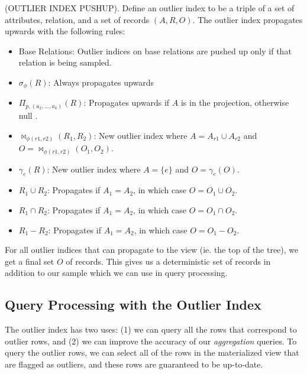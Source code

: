 \begin{definition}
(OUTLIER INDEX PUSHUP). Define an outlier index to be a triple of a set of attributes, relation, and a set of records $(A,R,O)$. The outlier index propagates upwards with the following rules:
\begin{itemize}\vspace{-.45em}
\item Base Relations: Outlier indices on base relations are pushed up only if that relation is being sampled.\vspace{-.45em}
\item $\sigma_{\phi}(R)$: Always propagates upwards \vspace{-.45em}
\item $\Pi_{p,(a_2,...,a_k)}(R)$:  Propagates upwards if $A$ is in the projection, otherwise null .\vspace{-.45em}
\item $\bowtie_{\phi (r1,r2)}(R_1,R_2)$: New outlier index where $A=A_{r1} \cup A_{r2}$ and $O = \bowtie_{\phi (r1,r2)}(O_1,O_2)$.
\item $\gamma_{e}(R)$: New outlier index where $A=\{e\}$ and $O = \gamma_{e}(O)$.\vspace{-.45em} 
\item $R_1 \cup R_2$: Propagates if $A_1 = A_2$, in which case $O = O_1 \cup O_2$. 
\item $R_1 \cap R_2$: Propagates if $A_1 = A_2$, in which case $O = O_1 \cap O_2$.
\item $R_1 - R_2$: Propagates if $A_1 = A_2$, in which case $O = O_1 - O_2$.
\end{itemize}
\end{definition}
For all outlier indices that can propagate to the view (ie. the top of the tree), we get a final set $O$ of records. 
This gives us a deterministic set of records in addition to our sample which we can use in query processing.

\subsection{Query Processing with the Outlier Index} 
The outlier index has two uses: (1) we can query all the rows that correspond to outlier rows, 
and (2) we can improve the accuracy of our \emph{aggregation} queries.
To query the outlier rows, we can select all of the rows in the materialized view that are flagged as outliers, and these rows are guaranteed to be up-to-date.

